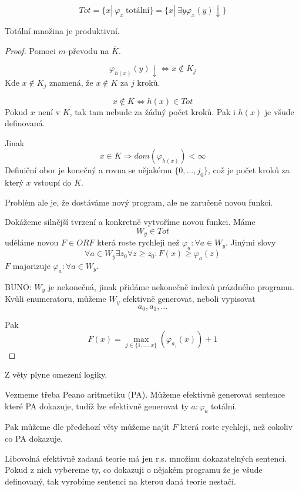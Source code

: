 \begin{definition}\label{tot_mn}
	\[ Tot = \{ x |\ \varphi_x\ \text{totální} \} = \{ x |\ \exists y \varphi_x(y) \downarrow \} \]
\end{definition}
\begin{lemma}
	Totální množina je produktivní.
\end{lemma}
\begin{proof}
	Pomoci $m$-převodu na $\overline{K}$.

	\[ \varphi_{h(x)} (y) \downarrow \iff x \notin K_j \]
	Kde $x \notin K_j$ znamená, že $x \notin K$ za $j$ kroků.

	\[ x \notin K \iff h(x) \in Tot \]
	Pokud $x$ není v $K$, tak tam nebude za žádný počet kroků. Pak i $h(x)$ je všude definovaná.

	Jinak
	\[ x \in K \Rightarrow dom(\varphi_{h(x)}) < \infty \]
	Definiční obor je konečný a rovna se nějakému $\{ 0, ..., j_0 \}$, což je počet kroků za který $x$ vstoupí do $K$.

	Problém ale je, že dostáváme nový program, ale ne zaručeně novou funkci.

	Dokážeme silnější tvrzení a konkretně vytvoříme novou funkci.
	Máme
	\[ W_y \in Tot \]
	uděláme novou $F \in ORF$ která roste rychleji než $\varphi_a: \forall a \in W_y$.
	Jinými slovy
	\[ \forall a \in W_y \exists z_0 \forall z \geq z_0: F(x) \geq \varphi_a(z) \]
	$F$ majorizuje $\varphi_a: \forall a \in W_y$.

	BUNO: $W_y$ je nekonečná, jinak přidáme nekonečně indexů prázdného programu.
	Kvůli enumeratoru, můžeme $W_y$ efektivně generovat, neboli vypisovat
	\[ a_0, a_1, \ldots \]

	Pak
	\[ F(x) = \max_{j \in \{ 1, \ldots, x \} } (\varphi_{a_j}(x)) + 1 \]
\end{proof}

\begin{consequence}
	Z věty plyne omezení logiky.

	Vezmeme třeba Peano aritmetiku (PA).
	Můžeme efektivně generovat sentence které PA dokazuje, tudíž lze efektivně generovat ty $a: \varphi_a$ totální.

	Pak můžeme dle předchozí věty můžeme najít $F$ která roste rychleji, než cokoliv co PA dokazuje.

	Libovolná efektivně zadaná teorie má jen r.s. množinu dokazatelných sentenci.
	Pokud z nich vybereme ty, co dokazuji o nějakém programu že je všude definovaný, tak vyrobíme sentenci na kterou daná teorie nestačí.
\end{consequence}
